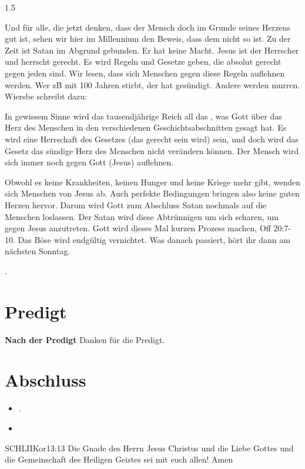 \documentclass[14pt]{../../inc/mybib}
\begin{document}
\begin{spacing}{1.5}
\begin{block}
        Und für alle, die jetzt denken, dass der Mensch doch im Grunde seines Herzens gut ist, sehen wir hier im Millennium den Beweis, dass dem nicht so ist. Zu der Zeit ist Satan im Abgrund gebunden. Er hat keine Macht. Jesus ist der Herrscher und herrscht gerecht. Es wird Regeln und Gesetze geben, die absolut gerecht gegen jeden sind. Wir lesen, dass sich Menschen gegen diese Regeln auflehnen werden. Wer z\.B mit 100 Jahren stirbt, der hat gesündigt. Andere werden murren. Wiersbe schreibt dazu:
        \begin{block}
            In gewissem Sinne wird das tausendjährige Reich all das , was Gott über das Herz des Menschen in den verschiedenen Geschichtsabschnitten gesagt hat. Es wird eine Herrschaft des Gesetzes (das gerecht sein wird) sein, und doch wird das Gesetz das sündige Herz des Menschen nicht verändern können. Der Mensch wird sich immer noch gegen Gott (Jesus) auflehnen.
        \end{block}        
        Obwohl es keine Krankheiten, keinen Hunger und keine Kriege mehr gibt, wenden sich Menschen von Jesus ab. Auch perfekte Bedingungen bringen also keine guten Herzen hervor. Darum wird Gott zum Abschluss Satan nochmals auf die Menschen loslassen. Der Satan wird diese Abtrünnigen um sich scharen, um gegen Jesus anzutreten. Gott wird dieses Mal kurzen Prozess machen, Off 20:7-10. Das Böse wird endgültig vernichtet. Was danach passiert, hört ihr dann am nächsten Sonntag.   
        
    \end{block}
    .
\end{spacing}
\section{Predigt}
\textbf{Nach der Predigt}\newline
Danken für die Predigt.
\section{Abschluss}
\begin{itemize}
    \item [] .
    \item [] 
\end{itemize}
\begin{bibelbox}{SCHL}{IIKor}{13:13}
    Die Gnade des Herrn Jesus Christus und die Liebe Gottes und die Gemeinschaft des Heiligen Geistes sei mit euch allen! Amen
\end{bibelbox}
\end{document}

